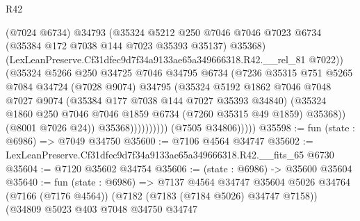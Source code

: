 \begin{lexlean}{R42}
\begin{coremodule}
{                                (@7024 @6734)
                                @34793
                                (@35324
                                  @5212
                                  @250
                                  @7046
                                  @7046
                                  @7023
                                  @6734
                                  (@35384 @172 @7038 @144 @7023 @35393 @35137)
                                  @35368)
                                (LexLeanPreserve.Cf31dfec9d7f34a9133ae65a349666318.R42.__rel_81
                                  @7022))
                              (@35324
                                @5266
                                @250
                                @34725
                                @7046
                                @34795
                                @6734
                                (@7236
                                  @35315
                                  @751
                                  @5265
                                  @7084
                                  @34724
                                  (@7028 @9074)
                                  @34795
                                  (@35324
                                    @5192
                                    @1862
                                    @7046
                                    @7048
                                    @7027
                                    @9074
                                    (@35384 @177 @7038 @144 @7027 @35393 @34840)
                                    (@35324
                                      @1860
                                      @250
                                      @7046
                                      @7046
                                      @1859
                                      @6734
                                      (@7260 @35315 @49 @1859)
                                      @35368))
                                  (@8001 @7026 @24))
                                @35368))))))))))
            (@7505 @34806)))))
@35598 := fun (state : @6986) => @7049 @34750
@35600 := @7106 @4564 @34747
@35602 := LexLeanPreserve.Cf31dfec9d7f34a9133ae65a349666318.R42.__fits_65 @6730
@35604 := @7120 @35602 @34754
@35606 := (state : @6986) -> @35600 @35604
@35640 := fun (state : @6986) =>
  @7137
    @4564
    @34747
    @35604
    @5026
    @34764
    (@7166 (@7176 @4564))
    (@7182 (@7183 (@7184 @5026) @34747 @7158))
    (@34809
      @5023
      @403
      @7048
      @34750
      @34747
}
\end{coremodule}
\end{lexlean}
